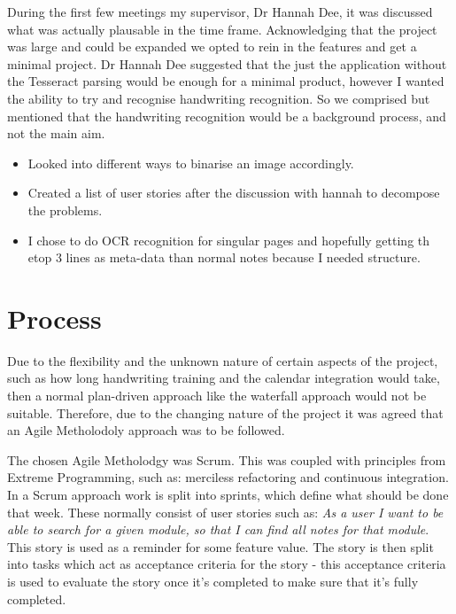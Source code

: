 During the first few meetings my supervisor, Dr Hannah Dee, it was discussed what was actually plausable in the time frame. Acknowledging that the project was large and could be expanded we opted to rein in the features and get a minimal project. Dr Hannah Dee suggested that the just the application without the Tesseract parsing would be enough for a minimal product, however I wanted the ability to try and recognise handwriting recognition. So we comprised but mentioned that the handwriting recognition would be a background process, and not the main aim.


\begin{itemize}
  \item Looked into different ways to binarise an image accordingly.
  \item Created a list of user stories after the discussion with hannah to decompose the problems.
  \item I chose to do OCR recognition for singular pages and hopefully getting th etop 3 lines as meta-data than normal notes because I needed structure.
\end{itemize}

\section{Process}
Due to the flexibility and the unknown nature of certain aspects of the project, such as how long handwriting training and the calendar integration would take, then a normal plan-driven approach like the waterfall approach would not be suitable. Therefore, due to the changing nature of the project it was agreed that an Agile Metholodoly approach was to be followed.

The chosen Agile Metholodgy was Scrum. This was coupled with principles from Extreme Programming, such as: merciless refactoring and continuous integration. In a Scrum approach work is split into sprints, which define what should be done that week. These normally consist of user stories such as: \textit{As a user I want to be able to search for a given module, so that I can find all notes for that module}. This story is used as a reminder for some feature value. The story is then split into tasks which act as acceptance criteria for the story - this acceptance criteria is used to evaluate the story once it's completed to make sure that it's fully completed.

